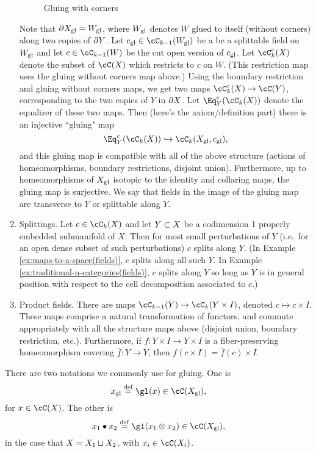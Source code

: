 \begin{enumerate}
\begin{figure}[t]
\begin{center}
\begin{tikzpicture}
\end{tikzpicture}
\end{center}
\caption{Gluing with corners}
\label{fig:gluing-with-corners}
\end{figure}
Note that $\bd X\sgl = W\sgl$, where $W\sgl$ denotes $W$ glued to itself
(without corners) along two copies of $\bd Y$.
Let $c\sgl \in \cC_{k-1}(W\sgl)$ be a be a splittable field on $W\sgl$ and let
$c \in \cC_{k-1}(W)$ be the cut open version of $c\sgl$.
Let $\cC^c_k(X)$ denote the subset of $\cC(X)$ which restricts to $c$ on $W$.
(This restriction map uses the gluing without corners map above.)
Using the boundary restriction and gluing without corners maps, 
we get two maps $\cC^c_k(X) \to \cC(Y)$, corresponding to the two
copies of $Y$ in $\bd X$.
Let $\Eq^c_Y(\cC_k(X))$ denote the equalizer of these two maps.
Then (here's the axiom/definition part) there is an injective ``gluing" map
\[
	\Eq^c_Y(\cC_k(X)) \hookrightarrow \cC_k(X\sgl, c\sgl) ,
\]
and this gluing map is compatible with all of the above structure (actions
of homeomorphisms, boundary restrictions, disjoint union).
Furthermore, up to homeomorphisms of $X\sgl$ isotopic to the identity
and collaring maps,
the gluing map is surjective.
We say that fields in the image of the gluing map
are transverse to $Y$ or splittable along $Y$.
\item Splittings.
Let $c\in \cC_k(X)$ and let $Y\sub X$ be a codimension 1 properly embedded submanifold of $X$.
Then for most small perturbations of $Y$ (i.e.\ for an open dense
subset of such perturbations) $c$ splits along $Y$.
(In Example \ref{ex:maps-to-a-space(fields)}, $c$ splits along all such $Y$.
In Example \ref{ex:traditional-n-categories(fields)}, $c$ splits along $Y$ so long as $Y$ 
is in general position with respect to the cell decomposition
associated to $c$.)
\item Product fields.
There are maps $\cC_{k-1}(Y) \to \cC_k(Y \times I)$, denoted
$c \mapsto c\times I$.
These maps comprise a natural transformation of functors, and commute appropriately
with all the structure maps above (disjoint union, boundary restriction, etc.).
Furthermore, if $f: Y\times I \to Y\times I$ is a fiber-preserving homeomorphism
covering $\bar{f}:Y\to Y$, then $f(c\times I) = \bar{f}(c)\times I$.
\end{enumerate}

There are two notations we commonly use for gluing.
One is 
\[
	x\sgl \deq \gl(x) \in \cC(X\sgl) , 
\]
for $x\in\cC(X)$.
The other is
\[
	x_1\bullet x_2 \deq \gl(x_1\otimes x_2) \in \cC(X\sgl) , 
\]
in the case that $X = X_1 \du X_2$, with $x_i \in \cC(X_i)$.

